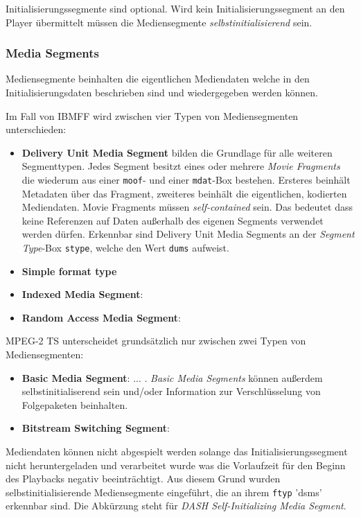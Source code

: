 \documentclass[paper = a4, fontsize = 12pt, parskip = half]{scrartcl} %
\def\attr#1{\texttt{#1}}
\begin{document}
Initialisierungssegmente sind optional. Wird kein Initialisierungssegment an den Player übermittelt müssen die Mediensegmente \textit{selbstinitialisierend} sein.

\subsubsection{Media Segments}
Mediensegmente beinhalten die eigentlichen Mediendaten welche in den Initialisierungsdaten beschrieben sind und wiedergegeben werden können.

Im Fall von IBMFF wird zwischen vier Typen von Mediensegmenten unterschieden:

\begin{itemize}
	\item \textbf{Delivery Unit Media Segment} bilden die Grundlage für alle weiteren Segmenttypen. Jedes Segment besitzt eines oder mehrere \textit{Movie Fragments} die wiederum aus einer \attr{moof}- und einer \attr{mdat}-Box bestehen. Ersteres beinhält Metadaten über das Fragment, zweiteres beinhält die eigentlichen, kodierten Mediendaten. Movie Fragments müssen \textit{self-contained} sein. Das bedeutet dass keine Referenzen auf Daten außerhalb des eigenen Segments verwendet werden dürfen. Erkennbar sind Delivery Unit Media Segments an der \textit{Segment Type}-Box \attr{stype}, welche den Wert \attr{dums} aufweist.
	\item \textbf{Simple format type} 
	\item \textbf{Indexed Media Segment}:
	\item \textbf{Random Access Media Segment}:
\end{itemize}

MPEG-2 TS unterscheidet grundsätzlich nur zwischen zwei Typen von Mediensegmenten:
\begin{itemize}
	\item \textbf{Basic Media Segment}: ... . \textit{Basic Media Segments} können außerdem selbstinitialiserend sein und/oder Information zur Verschlüsselung von Folgepaketen beinhalten.
	\item \textbf{Bitstream Switching Segment}:
\end{itemize}

Mediendaten können nicht abgespielt werden solange das Initialisierungssegment nicht heruntergeladen und verarbeitet wurde was die Vorlaufzeit für den Beginn des Playbacks negativ beeinträchtigt. Aus diesem Grund wurden selbstinitialisierende Mediensegmente eingeführt, die an ihrem \attr{ftyp} 'dsms' erkennbar sind. Die Abkürzung steht für \textit{DASH Self-Initializing Media Segment}.
\end{document}

